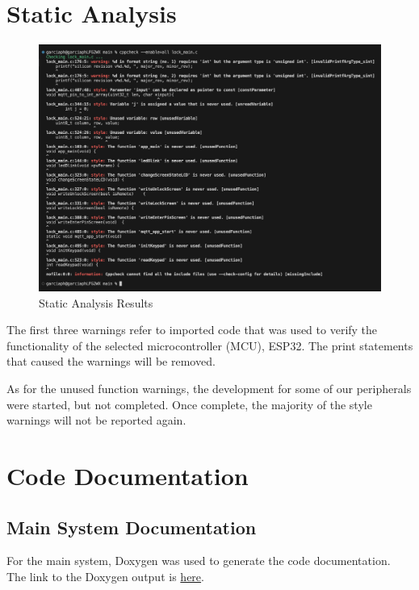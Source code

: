 \section{Static Analysis}

\begin{figure}[htb]
    \begin{center}
        \includegraphics[width = \textwidth]{Images/CIS 350 - Project - Static Analysis Results.png}
        \caption{Static Analysis Results}
        \label{fig: Static Analysis Results}
    \end{center}
\end{figure}

The first three warnings refer to imported code that was used to verify the functionality of the selected microcontroller (MCU), ESP32. The print statements that caused the warnings will be removed. 

As for the unused function warnings, the development for some of our peripherals were started, but not completed. Once complete, the majority of the style warnings will not be reported again. 

\clearpage
\section{Code Documentation}
\subsection{Main System Documentation}
For the main system, Doxygen was used to generate the code documentation. The link to the Doxygen output is \href{https://github.com/CIS-350/lock/blob/development/html/release_1_doxygen.pdf}{here}.

